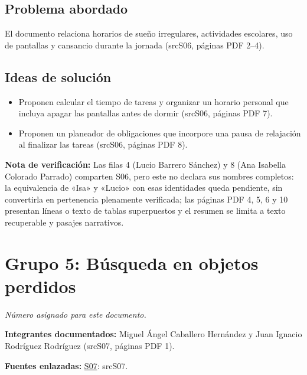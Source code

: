 \documentclass[11pt,a4paper]{article}
\newcommand{\evid}[2]{(\csname src#1\endcsname, páginas PDF #2)}
\begin{document}
\subsection*{Problema abordado}
El documento relaciona horarios de sueño irregulares, actividades escolares, uso de pantallas y cansancio durante la jornada \evid{S06}{2--4}.
\subsection*{Ideas de solución}
\begin{itemize}
\item Proponen calcular el tiempo de tareas y organizar un horario personal que incluya apagar las pantallas antes de dormir \evid{S06}{7}.
\item Proponen un planeador de obligaciones que incorpore una pausa de relajación al finalizar las tareas \evid{S06}{8}.
\end{itemize}
{\small\textbf{Nota de verificación:} Las filas 4 (Lucio Barrero Sánchez) y 8 (Ana Isabella Colorado Parrado) comparten S06, pero este no declara sus nombres completos: la equivalencia de «Isa» y «Lucio» con esas identidades queda pendiente, sin convertirla en pertenencia plenamente verificada; las páginas PDF 4, 5, 6 y 10 presentan líneas o texto de tablas superpuestos y el resumen se limita a texto recuperable y pasajes narrativos.}
\clearpage
\section*{Grupo 5: Búsqueda en objetos perdidos}
\textit{Número asignado para este documento.}

\textbf{Integrantes documentados:} Miguel Ángel Caballero Hernández y Juan Ignacio Rodríguez Rodríguez \evid{S07}{1}.

\textbf{Fuentes enlazadas:} \hyperlink{fuente-S07}{S07}: \csname srcS07\endcsname.
\end{document}
